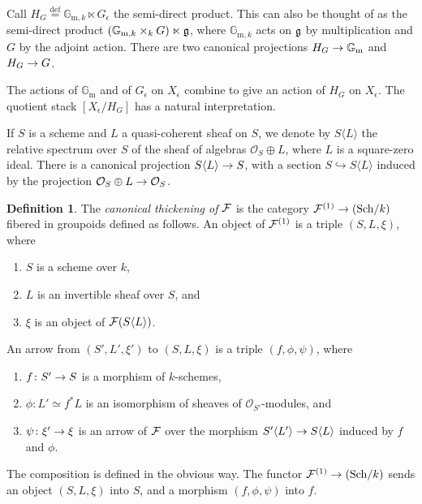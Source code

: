 \documentclass{amsart}
\numberwithin{equation}{section}
\numberwithin{subsection}{section}
\newenvironment{enumeratea}
{\begin{enumerate}[\upshape (a)]}
{\end{enumerate}}
\theoremstyle{definition}
\newtheorem{definition}[theorem]{Definition}
\theoremstyle{remark}
\newcommand\cO{\mathcal{O}} \newcommand\cP{\mathcal{P}}
\newcommand\arr{\ifinner\to\else\longrightarrow\fi}
\newcommand\eqdef{\overset{\mathrm{\scriptscriptstyle def}} =}
\newcommand\into{\hookrightarrow}
\newcommand\generate[1]{\langle #1 \rangle}
\newcommand{\catsch}[1]{(\mathrm{Sch}/#1)}
\newcommand{\gm}{\mathbb{G}_{\mathrm{m}}}
\newcommand{\gms}[1]{\mathbb{G}_{\mathrm{m}, #1}}
\begin{document}
Call $H_G\eqdef \gms{k} \ltimes G_{\epsilon}$ the semi-direct product. This can also be thought of as the semi-direct product $(\gms{k} \times_{k} G) \ltimes \frg$, where $\gms{k}$ acts on $\mathfrak{g}$ by multiplication and $G$ by the adjoint action. There are two canonical projections $H_{G} \arr \gm$ and $H_{G} \arr G$.

The actions of $\gm$ and of $G_{\epsilon}$ on $X_{\epsilon}$ combine to give an action of $H_G$ on $X_{\epsilon}$. The quotient stack $[X_{\epsilon}/H_G]$ has a natural interpretation.

If $S$ is a scheme and $L$ a quasi-coherent sheaf on $S$, we denote by $S\generate{L}$ the relative spectrum over $S$ of the sheaf of algebras $\cO_{S} \oplus L$, where $L$ is a square-zero ideal. There is a canonical projection $S\generate{L} \arr S$, with a section $S \into S\generate{L}$ induced by the projection $\cO_{S} \oplus L \arr \cO_{S}$.

\begin{definition}\label{thick}
The \emph{canonical thickening of $\mathcal{F}$} is the category $\cF^{(1)} \arr \catsch{k}$ fibered in groupoids defined as follows.  An object of $\mathcal{F}^{(1)}$ is a triple $(S, L, \xi)$, where

\begin{enumeratea}

\item $S$ is a scheme over $k$,

\item $L$ is an invertible sheaf over $S$, and

\item $\xi$ is an object of $\cF(S\generate{L})$.

\end{enumeratea}

An arrow from $(S', L', \xi')$ to $(S, L, \xi)$ is a triple $(f, \phi, \psi)$, where

\begin{enumeratea}

\item $f\colon S' \arr S$ is a morphism of $k$-schemes,

\item $\phi\colon L' \simeq f^{*}L$ is an isomorphism of sheaves of $\cO_{S'}$-modules, and

\item $\psi\colon \xi' \arr \xi$ is an arrow of $\mathcal{F}$ over the morphism $S'\generate{L'} \arr S\generate{L}$ induced by $f$ and $\phi$.

\end{enumeratea}

The composition is defined in the obvious way. The functor $\cF^{(1)} \arr \catsch{k}$ sends an object $(S, L, \xi)$ into $S$, and a morphism $(f, \phi, \psi)$ into $f$.

\end{definition}
\end{document}
